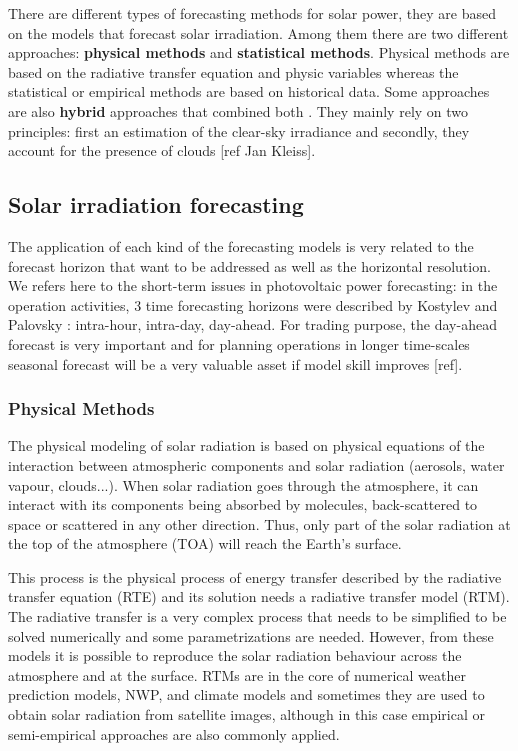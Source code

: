 There are different types of forecasting methods for solar power, they are based on the models that forecast solar irradiation. Among them there are two different approaches: \textbf{physical methods} and \textbf{statistical methods}. Physical methods are based on the radiative transfer equation and physic variables whereas the statistical or empirical methods are based on historical data. Some approaches are also \textbf{hybrid} approaches that combined both \cite*{Diagne2013, Tovar-Pescador2008}. They mainly rely on two principles: first an estimation of the clear-sky irradiance and secondly, they account for the presence of clouds [ref Jan Kleiss].  


\subsection{Solar irradiation forecasting}

The application of each kind of the forecasting models is very related to the forecast horizon that want to be addressed as well as the horizontal resolution. We refers here to the short-term issues in photovoltaic power forecasting: in the operation activities, 3 time forecasting horizons were described by Kostylev and Palovsky \cite*{kostylev2011solar}: intra-hour, intra-day, day-ahead. For trading purpose, the day-ahead forecast is very important and for planning operations in longer time-scales seasonal forecast will be a very valuable asset if model skill improves [ref]. 

\subsubsection{Physical Methods}

The physical modeling of solar radiation is based on physical equations of the interaction between atmospheric components and solar radiation (aerosols, water vapour, clouds...). When solar radiation goes through the atmosphere, it can interact with its components being absorbed by molecules, back-scattered to space or scattered in any other direction. Thus, only part of the solar radiation at the top of the atmosphere (TOA) will reach the Earth's surface.

This process is the physical process of energy transfer described by the radiative transfer equation (RTE) and its solution needs a radiative transfer model (RTM). The radiative transfer is a very complex process that needs to be simplified to be solved numerically and some parametrizations are needed. However, from these models it is possible to reproduce the solar radiation behaviour across the atmosphere and at the surface. RTMs are in the core of numerical weather prediction models, NWP, and climate models and sometimes they are used to obtain solar radiation from satellite images, although in this case empirical or semi-empirical approaches are also commonly applied.

